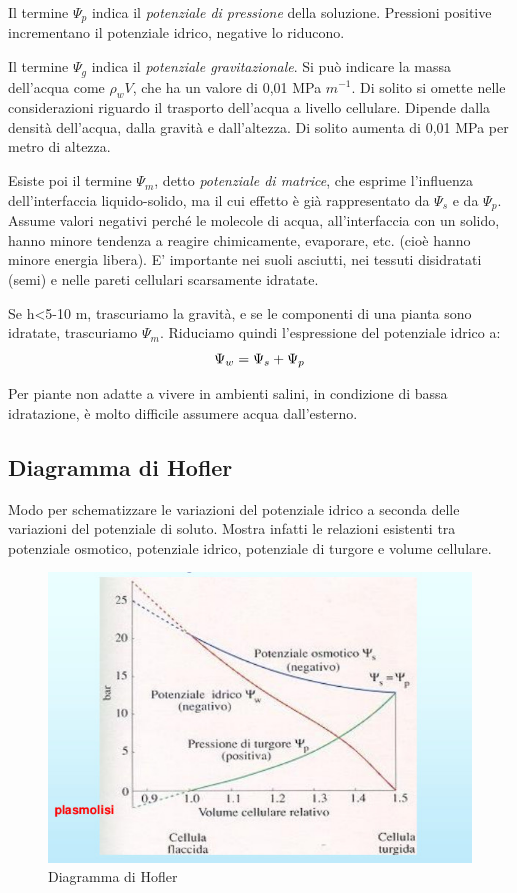 \documentclass[a4paper,12pt]{book}
\begin{document}
Il termine $\Psi_{p}$ indica il \emph{potenziale di pressione} della soluzione. Pressioni positive incrementano il potenziale idrico, negative lo riducono.

Il termine $\Psi_{g}$ indica il \emph{potenziale gravitazionale}. Si può indicare la massa dell'acqua come $\rho_{w} V$, che ha un valore di 0,01 MPa $m^{-1}$. Di solito si omette nelle considerazioni riguardo il trasporto dell'acqua a livello cellulare. Dipende dalla densità dell’acqua, dalla gravità e dall’altezza. Di solito aumenta di 0,01 MPa per metro di altezza.

Esiste poi il termine $\Psi_{m}$, detto \emph{potenziale di matrice}, che esprime l'influenza dell'interfaccia liquido-solido, ma il cui effetto è già rappresentato da $\Psi_{s}$ e da $\Psi_{p}$. Assume valori negativi perché le molecole di acqua, all'interfaccia con un solido,
hanno minore tendenza a reagire chimicamente, evaporare, etc. (cioè hanno
minore energia libera).
E' importante nei suoli asciutti, nei tessuti disidratati (semi) e nelle pareti cellulari
scarsamente idratate.

Se h<5-10 m, trascuriamo la gravità, e se le componenti di una pianta sono idratate, trascuriamo $\Psi_{m}$. Riduciamo quindi l'espressione del potenziale idrico a:
\begin{equation}
\centering
\Psi_{w}= \Psi_{s} + \Psi_{p}
\end{equation}

Per piante non adatte a vivere in ambienti salini, in condizione di bassa idratazione, è molto difficile assumere acqua dall'esterno. 

\subsection{Diagramma di Hofler}
Modo per schematizzare le variazioni del potenziale idrico a seconda delle variazioni del potenziale di soluto. Mostra infatti le relazioni esistenti tra potenziale osmotico, potenziale idrico, potenziale di turgore e volume cellulare.
\begin{figure}[H]
\centering
\includegraphics[scale=0.4]{immagini/hofler.jpg}
\caption{Diagramma di Hofler}
\end{figure}
\end{document}
